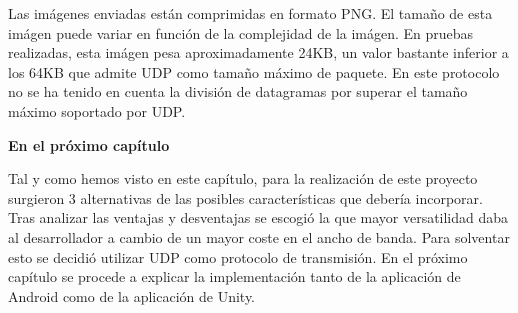 Las im\'agenes enviadas est\'an comprimidas en formato PNG. El tama\~no de esta im\'agen puede variar en funci\'on de la complejidad de la im\'agen. En pruebas realizadas, esta im\'agen pesa aproximadamente 24KB, un valor bastante inferior a los 64KB que admite UDP como tama\~no m\'aximo de paquete. En este protocolo no se ha tenido en cuenta la divisi\'on de datagramas por superar el tama\~no m\'aximo soportado por UDP.\\

\vspace{30mm}

\bigskip
\Large{\textbf{En el pr\'oximo cap\'itulo}}\\
\normalsize

Tal y como hemos visto en este cap\'itulo, para la realizaci\'on de este proyecto surgieron 3 alternativas de las posibles caracter\'isticas que deber\'ia incorporar. Tras analizar las ventajas y desventajas se escogi\'o la que mayor versatilidad daba al desarrollador a cambio de un mayor coste en el ancho de banda. Para solventar esto se decidi\'o utilizar UDP como protocolo de transmisi\'on. En el pr\'oximo cap\'itulo se procede a explicar la implementaci\'on tanto de la aplicaci\'on de Android como de  la aplicaci\'on de Unity. 


